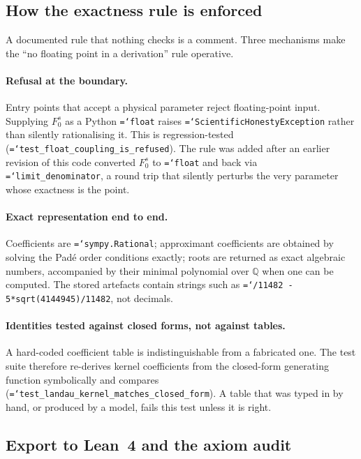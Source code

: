 \documentclass[11pt,a4paper]{article}
\newcommand{\Fzs}{F_0^{s}}
\newcommand{\code}[1]{\texttt{\hyphenchar\font=`\-\relax #1}}
\begin{document}
\subsection{How the exactness rule is enforced}

A documented rule that nothing checks is a comment. Three mechanisms make the
``no floating point in a derivation'' rule operative.

\paragraph{Refusal at the boundary.} Entry points that accept a physical
parameter reject floating-point input. Supplying $\Fzs$ as a Python
\code{float} raises \code{ScientificHonestyException} rather than silently
rationalising it. This is regression-tested
(\code{test\_float\_coupling\_is\_refused}). The rule was added after an
earlier revision of this code converted $\Fzs$ to \code{float} and back via
\code{limit\_denominator}, a round trip that silently perturbs the very
parameter whose exactness is the point.

\paragraph{Exact representation end to end.} Coefficients are
\code{sympy.Rational}; approximant coefficients are obtained by solving the
Pad\'e order conditions exactly; roots are returned as exact algebraic numbers,
accompanied by their minimal polynomial over $\mathbb{Q}$ when one can be
computed. The stored artefacts contain strings such as
\code{13265/11482 - 5*sqrt(4144945)/11482}, not decimals.

\paragraph{Identities tested against closed forms, not against tables.} A
hard-coded coefficient table is indistinguishable from a fabricated one. The
test suite therefore re-derives kernel coefficients from the closed-form
generating function symbolically and compares
(\code{test\_landau\_kernel\_matches\_closed\_form}). A table that was typed in
by hand, or produced by a model, fails this test unless it is right.

\subsection{Export to Lean~4 and the axiom audit}
\label{sec:leanexport}
\end{document}
